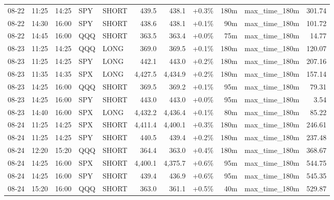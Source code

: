 \documentclass[11pt,a4paper,twoside]{article}
\begin{document}
\begin{center}
\begin{longtable}{>{\color{txtmain}}l l l l l r r r r >{\color{txtmain}}l r}
08-22 & 11:25 & 14:25 & SPY & SHORT & 439.5 & 438.1 & \textcolor{wingreen}{+0.3\%} & 180m & max\_time\_180m & \textcolor{wingreen}{301.74} \\
08-22 & 14:30 & 16:00 & SPY & SHORT & 438.6 & 438.1 & \textcolor{wingreen}{+0.1\%} & 90m & max\_time\_180m & \textcolor{wingreen}{101.72} \\
08-22 & 14:45 & 16:00 & QQQ & SHORT & 363.5 & 363.4 & \textcolor{wingreen}{+0.0\%} & 75m & max\_time\_180m & \textcolor{wingreen}{14.77} \\
08-23 & 11:25 & 14:25 & QQQ & LONG & 369.0 & 369.5 & \textcolor{wingreen}{+0.1\%} & 180m & max\_time\_180m & \textcolor{wingreen}{120.07} \\
08-23 & 11:25 & 14:25 & SPY & LONG & 442.1 & 443.0 & \textcolor{wingreen}{+0.2\%} & 180m & max\_time\_180m & \textcolor{wingreen}{207.16} \\
08-23 & 11:35 & 14:35 & SPX & LONG & 4,427.5 & 4,434.9 & \textcolor{wingreen}{+0.2\%} & 180m & max\_time\_180m & \textcolor{wingreen}{157.14} \\
08-23 & 14:25 & 16:00 & QQQ & SHORT & 369.5 & 369.2 & \textcolor{wingreen}{+0.1\%} & 95m & max\_time\_180m & \textcolor{wingreen}{79.31} \\
08-23 & 14:25 & 16:00 & SPY & SHORT & 443.0 & 443.0 & \textcolor{wingreen}{+0.0\%} & 95m & max\_time\_180m & \textcolor{wingreen}{3.54} \\
08-23 & 14:40 & 16:00 & SPX & LONG & 4,432.2 & 4,436.4 & \textcolor{wingreen}{+0.1\%} & 80m & max\_time\_180m & \textcolor{wingreen}{85.22} \\
08-24 & 11:25 & 14:25 & SPX & SHORT & 4,411.4 & 4,400.1 & \textcolor{wingreen}{+0.3\%} & 180m & max\_time\_180m & \textcolor{wingreen}{246.61} \\
08-24 & 11:25 & 14:25 & SPY & SHORT & 440.5 & 439.4 & \textcolor{wingreen}{+0.2\%} & 180m & max\_time\_180m & \textcolor{wingreen}{237.48} \\
08-24 & 12:20 & 15:20 & QQQ & SHORT & 364.4 & 363.0 & \textcolor{wingreen}{+0.4\%} & 180m & max\_time\_180m & \textcolor{wingreen}{368.67} \\
08-24 & 14:25 & 16:00 & SPX & SHORT & 4,400.1 & 4,375.7 & \textcolor{wingreen}{+0.6\%} & 95m & max\_time\_180m & \textcolor{wingreen}{544.75} \\
08-24 & 14:25 & 16:00 & SPY & SHORT & 439.4 & 436.9 & \textcolor{wingreen}{+0.6\%} & 95m & max\_time\_180m & \textcolor{wingreen}{545.35} \\
08-24 & 15:20 & 16:00 & QQQ & SHORT & 363.0 & 361.1 & \textcolor{wingreen}{+0.5\%} & 40m & max\_time\_180m & \textcolor{wingreen}{529.87} \\

\end{longtable}
\end{center}
\end{document}
